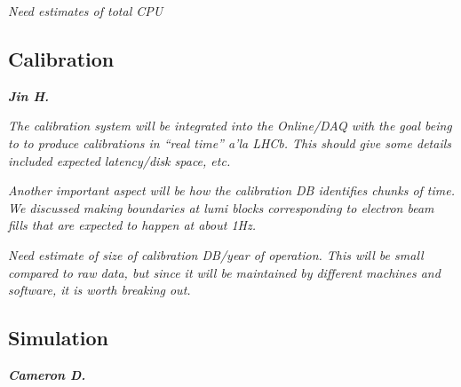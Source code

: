 

\emph{Need estimates of total CPU}

\subsection{Calibration}

\textbf{\emph{Jin H.}}

\emph{The calibration system will be integrated into the Online/DAQ with the goal being to to produce calibrations in ``real time'' a'la LHCb. This should give some details included expected latency/disk space, etc.}

\emph{Another important aspect will be how the calibration DB identifies chunks of time. We discussed making boundaries at lumi blocks corresponding to electron beam fills that are expected to happen at about 1Hz.}

\emph{Need estimate of size of calibration DB/year of operation. This will be small compared to raw data, but since it will be maintained by different machines and software, it is worth breaking out.}

\subsection{Simulation}

\textbf{\emph{Cameron D.}}


